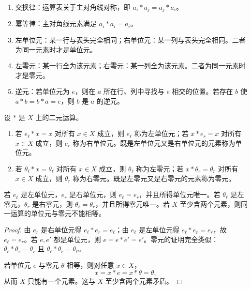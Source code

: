 \begin{method}[从运算表读取性质]\label{table-reading}
  \begin{enumerate}
    \item 交换律：运算表关于主对角线对称，即 $a_i*a_j=a_j*a_i$。
    \item 幂等律：主对角线元素满足 $a_i*a_i=a_i$。
    \item 左单位元：某一行与表头完全相同；右单位元：某一列与表头完全相同。二者为同一元素时才是单位元。
    \item 左零元：某一行全为该元素；右零元：某一列全为该元素。二者为同一元素时才是零元。
    \item 逆元：若单位元为 $e$，则在 $a$ 所在行、列中寻找与 $e$ 相交的位置。若存在 $b$ 使 $a*b=b*a=e$，则 $b$ 是 $a$ 的逆元。
  \end{enumerate}
\end{method}

\begin{definition}\label{one-zero-sided}
  设 $*$ 是 $X$ 上的二元运算。
  \begin{enumerate}
    \item 若 $e_\ell*x=x$ 对所有 $x\in X$ 成立，则 $e_\ell$ 称为左单位元；若 $x*e_r=x$ 对所有 $x\in X$ 成立，则 $e_r$ 称为右单位元。既是左单位元又是右单位元的元素称为单位元。
    \item 若 $\theta_\ell*x=\theta_\ell$ 对所有 $x\in X$ 成立，则 $\theta_\ell$ 称为左零元；若 $x*\theta_r=\theta_r$ 对所有 $x\in X$ 成立，则 $\theta_r$ 称为右零元。既是左零元又是右零元的元素称为零元。
  \end{enumerate}
\end{definition}

\begin{theorem}[单位元与零元的唯一性]\label{one-zero-unique}
  若 $e_\ell$ 是左单位元，$e_r$ 是右单位元，则 $e_\ell=e_r$，并且所得单位元唯一。若 $\theta_\ell$ 是左零元，$\theta_r$ 是右零元，则 $\theta_\ell=\theta_r$，并且所得零元唯一。若 $X$ 至少含两个元素，则同一运算的单位元与零元不能相等。
\end{theorem}

\begin{proof}
  由 $e_r$ 是右单位元得 $e_\ell*e_r=e_\ell$；由 $e_\ell$ 是左单位元得 $e_\ell*e_r=e_r$，故 $e_\ell=e_r$。若 $e,e'$ 都是单位元，则 $e=e*e'=e'$。零元的证明完全类似：$\theta_\ell*\theta_r=\theta_r$ 且 $\theta_\ell*\theta_r=\theta_\ell$。

  若单位元 $e$ 与零元 $\theta$ 相等，则对任意 $x\in X$，
  \[
  x=x*e=x*\theta=\theta,
  \]
  从而 $X$ 只能有一个元素。这与 $X$ 至少含两个元素矛盾。
\end{proof}


